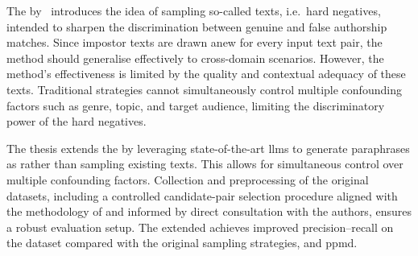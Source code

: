 The \impAppr{} by \citet{koppel_determining_2014}\ introduces the idea of sampling so-called \imp{} texts, i.e.\ hard negatives, intended to sharpen the discrimination between genuine and false authorship matches. 
Since impostor texts are drawn anew for every input text pair, the method should generalise effectively to cross-domain scenarios.
However, the method's effectiveness is limited by the quality and contextual adequacy of these \imp{} texts. 
Traditional strategies cannot simultaneously control multiple confounding factors such as genre, topic, and target audience, limiting the discriminatory power of the hard negatives.

The thesis extends the \impAppr{} by leveraging state-of-the-art \acp{llm} to generate paraphrases as \imps{} rather than sampling existing texts.
This allows for simultaneous control over multiple confounding factors.
Collection and preprocessing of the original datasets, including a controlled candidate-pair selection procedure aligned with the methodology of \citet{koppel_determining_2014} and informed by direct consultation with the authors, ensures a robust evaluation setup. 
The extended \impAppr{} achieves improved precision–recall on the \dataStudent{} dataset compared with the original sampling strategies, \unmasking{} and \acs{ppmd}.
